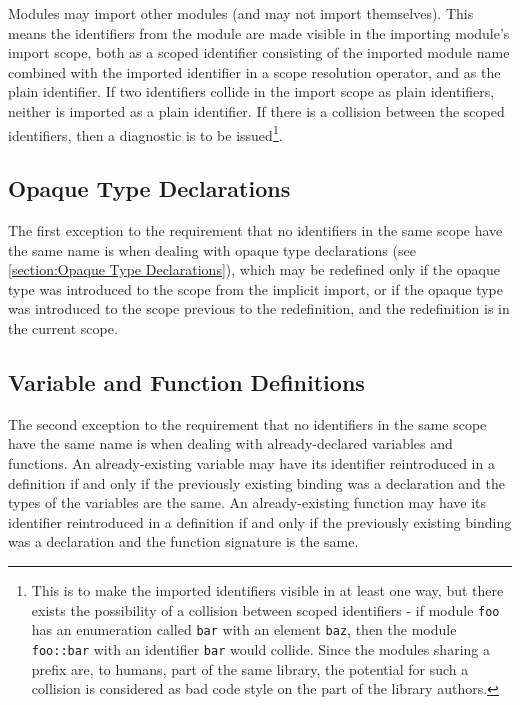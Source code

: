\documentclass[letterpaper,12pt]{book}
\begin{document}
Modules may import other modules (and may not import themselves). This means the identifiers from the module are made visible in the importing module's import scope, both as a scoped identifier consisting of the imported module name combined with the imported identifier in a scope resolution operator, and as the plain identifier. If two identifiers collide in the import scope as plain identifiers, neither is imported as a plain identifier. If there is a collision between the scoped identifiers, then a diagnostic is to be issued\footnote{This is to make the imported identifiers visible in at least one way, but there exists the possibility of a collision between scoped identifiers - if module \texttt{foo} has an enumeration called \texttt{bar} with an element \texttt{baz}, then the module \texttt{foo::bar} with an identifier \texttt{bar} would collide. Since the modules sharing a prefix are, to humans, part of the same library, the potential for such a collision is considered as bad code style on the part of the library authors.}.

\subsection{Opaque Type Declarations}

The first exception to the requirement that no identifiers in the same scope have the same name is when dealing with opaque type declarations (see \ref{section:Opaque Type Declarations}), which may be redefined only if the opaque type was introduced to the scope from the implicit import, or if the opaque type was introduced to the scope previous to the redefinition, and the redefinition is in the current scope.

\subsection{Variable and Function Definitions}

The second exception to the requirement that no identifiers in the same scope have the same name is when dealing with already-declared variables and functions. An already-existing variable may have its identifier reintroduced in a definition if and only if the previously existing binding was a declaration and the types of the variables are the same. An already-existing function may have its identifier reintroduced in a definition if and only if the previously existing binding was a declaration and the function signature is the same.
\end{document}
